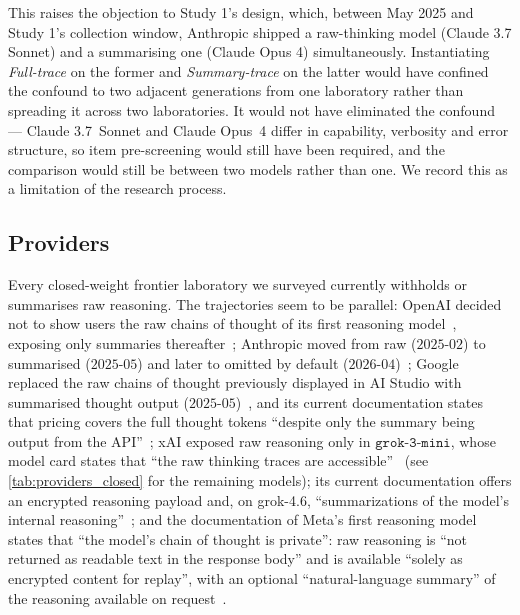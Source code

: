 \documentclass[manuscript,review,anonymous]{acmart}
\begin{document}
This raises the objection to Study 1's design, which, between May 2025 and Study 1's collection window, Anthropic
shipped a raw-thinking model (Claude 3.7 Sonnet) and a summarising one (Claude
Opus 4) simultaneously. Instantiating \textit{Full-trace} on the former and
\textit{Summary-trace} on the latter would have confined the confound to two
adjacent generations from one laboratory rather than spreading it across two
laboratories. It would not have
eliminated the confound --- Claude 3.7~Sonnet and Claude Opus~4 differ in capability, verbosity and
error structure, so item pre-screening would still have been required, and the
comparison would still be between two models rather than one. We record this as a limitation of the research process.

\subsection{Providers}
Every closed-weight frontier laboratory we surveyed currently withholds or summarises
raw reasoning. The trajectories seem to be parallel: OpenAI decided not to show
users the raw chains of thought of its first reasoning
model~\cite{openai2024learning}, exposing only summaries
thereafter~\cite{openai2025reasoningapi}; Anthropic moved from raw ($2025$-$02$) to
summarised ($2025$-$05$) and later to omitted by default
($2026$-$04$)~\cite{anthropic2025extended,anthropic2025claude4,anthropic2026thinking};
Google replaced the raw chains of thought previously displayed in AI Studio
with summarised thought output ($2025$-$05$)~\cite{google2025thoughtsummaries},
and its current documentation states that pricing covers the full thought
tokens ``despite only the summary being output from the
API''~\cite{google2025thinking}; xAI exposed raw reasoning only in $\texttt{grok-3-mini}$, whose model card
states that ``the raw thinking traces are
accessible''~\cite{oracle2026grok3mini} (see \autoref{tab:providers_closed}
for the remaining models); its current documentation offers an
encrypted reasoning payload and, on grok-4.6, ``summarizations of the
model's internal reasoning''~\cite{xai2026reasoning}; and the documentation of Meta's first reasoning model states that ``the
model's chain of thought is private'': raw reasoning is ``not returned as
readable text in the response body'' and is available ``solely as encrypted
content for replay'', with an optional ``natural-language summary'' of the
reasoning available on request~\cite{meta2026reasoning}.
\end{document}
